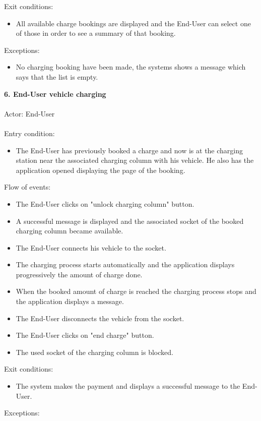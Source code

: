 \documentclass[a4paper]{report}
\begin{document}
Exit conditions:
\begin{itemize}
\item All available charge bookings are displayed and the End-User can select one of those in order to see a summary of that booking.
\end{itemize}
Exceptions:
\begin{itemize}
\item No charging booking have been made, the systems shows a message which says that the list is empty.
\end{itemize}
\textbf{6. End-User vehicle charging}\label{uc:7}
\\ \\
Actor: End-User \\ \\
Entry condition:
\begin{itemize}
\item The End-User has previously booked a charge and now is at the charging station near the associated charging column with his vehicle. He also has the application opened displaying the page of the booking.
\end{itemize}
Flow of events:
\begin{itemize}
\item The End-User clicks on "unlock charging column" button.
\item A successful message is displayed and the associated socket of the booked charging column became available.
\item The End-User connects his vehicle to the socket.
\item The charging process starts automatically and the application displays progressively the amount of charge done.
\item When the booked amount of charge is reached the charging process stops and the application displays a message.
\item The End-User disconnects the vehicle from the socket.
\item The End-User clicks on "end charge" button.
\item The used socket of the charging column is blocked.
\end{itemize}
Exit conditions:
\begin{itemize}
\item The system makes the payment and displays a successful message to the End-User.
\end{itemize}
Exceptions:
\end{document}
